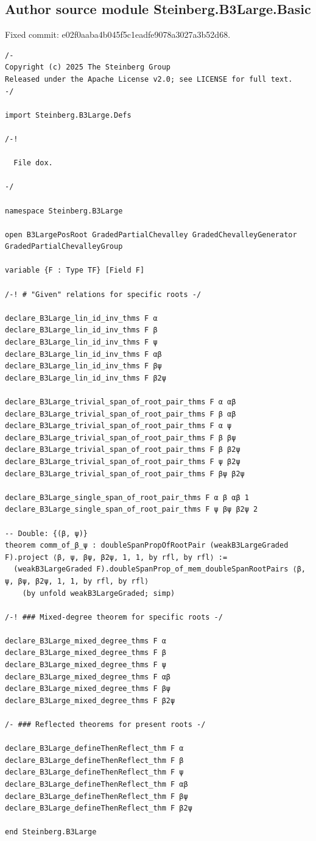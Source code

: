 \documentclass[10pt,a4paper]{article}
\begin{document}
\subsection*{Author source module Steinberg.B3Large.Basic}
\noindent Fixed commit: e02f0aaba4b045f5c1eadfe9078a3027a3b52d68.
\begin{Verbatim}
/-
Copyright (c) 2025 The Steinberg Group
Released under the Apache License v2.0; see LICENSE for full text.
-/

import Steinberg.B3Large.Defs

/-!

  File dox.

-/

namespace Steinberg.B3Large

open B3LargePosRoot GradedPartialChevalley GradedChevalleyGenerator GradedPartialChevalleyGroup

variable {F : Type TF} [Field F]

/-! # "Given" relations for specific roots -/

declare_B3Large_lin_id_inv_thms F α
declare_B3Large_lin_id_inv_thms F β
declare_B3Large_lin_id_inv_thms F ψ
declare_B3Large_lin_id_inv_thms F αβ
declare_B3Large_lin_id_inv_thms F βψ
declare_B3Large_lin_id_inv_thms F β2ψ

declare_B3Large_trivial_span_of_root_pair_thms F α αβ
declare_B3Large_trivial_span_of_root_pair_thms F β αβ
declare_B3Large_trivial_span_of_root_pair_thms F α ψ
declare_B3Large_trivial_span_of_root_pair_thms F β βψ
declare_B3Large_trivial_span_of_root_pair_thms F β β2ψ
declare_B3Large_trivial_span_of_root_pair_thms F ψ β2ψ
declare_B3Large_trivial_span_of_root_pair_thms F βψ β2ψ

declare_B3Large_single_span_of_root_pair_thms F α β αβ 1
declare_B3Large_single_span_of_root_pair_thms F ψ βψ β2ψ 2

-- Double: {(β, ψ)}
theorem comm_of_β_ψ : doubleSpanPropOfRootPair (weakB3LargeGraded F).project ⟨β, ψ, βψ, β2ψ, 1, 1, by rfl, by rfl⟩ :=
  (weakB3LargeGraded F).doubleSpanProp_of_mem_doubleSpanRootPairs ⟨β, ψ, βψ, β2ψ, 1, 1, by rfl, by rfl⟩
    (by unfold weakB3LargeGraded; simp)

/-! ### Mixed-degree theorem for specific roots -/

declare_B3Large_mixed_degree_thms F α
declare_B3Large_mixed_degree_thms F β
declare_B3Large_mixed_degree_thms F ψ
declare_B3Large_mixed_degree_thms F αβ
declare_B3Large_mixed_degree_thms F βψ
declare_B3Large_mixed_degree_thms F β2ψ

/- ### Reflected theorems for present roots -/

declare_B3Large_defineThenReflect_thm F α
declare_B3Large_defineThenReflect_thm F β
declare_B3Large_defineThenReflect_thm F ψ
declare_B3Large_defineThenReflect_thm F αβ
declare_B3Large_defineThenReflect_thm F βψ
declare_B3Large_defineThenReflect_thm F β2ψ

end Steinberg.B3Large
\end{Verbatim}
\end{document}

